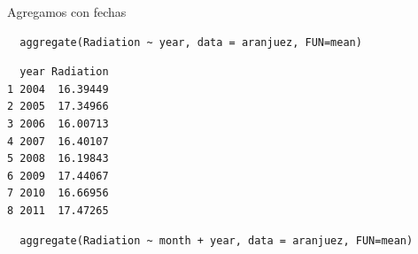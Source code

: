 \documentclass[xcolor={usenames,svgnames,dvipsnames}]{beamer}
\begin{document}
\begin{frame}[fragile,label=sec-5-3-4]{Agregamos con fechas}
 \lstset{language=R,label= ,caption= ,numbers=none}
\begin{lstlisting}
  aggregate(Radiation ~ year, data = aranjuez, FUN=mean)
\end{lstlisting}

\begin{verbatim}
  year Radiation
1 2004  16.39449
2 2005  17.34966
3 2006  16.00713
4 2007  16.40107
5 2008  16.19843
6 2009  17.44067
7 2010  16.66956
8 2011  17.47265
\end{verbatim}

\lstset{language=R,label= ,caption= ,numbers=none}
\begin{lstlisting}
  aggregate(Radiation ~ month + year, data = aranjuez, FUN=mean)
\end{lstlisting}


\end{frame}
\end{document}

